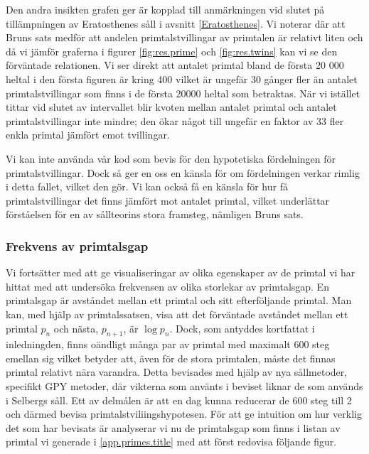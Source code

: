 Den andra insikten grafen ger är kopplad till anmärkningen vid slutet på tillämpningen av Eratosthenes såll i avsnitt \ref{Eratosthenes}.
Vi noterar där att Bruns sats medför att andelen primtalstvillingar av primtalen är relativt liten och då vi jämför graferna i figurer \ref{fig:res.prime} och \ref{fig:res.twins} kan vi se den förväntade relationen.
Vi ser direkt att antalet primtal bland de första 20 000 heltal i den första figuren är kring 400 vilket är ungefär 30 gånger fler än antalet primtalstvillingar som finns i de första 20000 heltal som betraktas.
När vi istället tittar vid slutet av intervallet blir kvoten mellan antalet primtal och antalet primtalstvillingar inte mindre; den ökar något till ungefär en faktor av 33 fler enkla primtal jämfört emot tvillingar.

Vi kan inte använda vår kod som bevis för den hypotetiska fördelningen för primtalstvillingar. 
Dock så ger en oss en känsla för om fördelningen verkar rimlig i detta fallet, vilket den gör. Vi kan också få en känsla för hur få primtalstvillingar det finns jämfört mot antalet primtal, vilket underlättar förståelsen för en av sållteorins stora framsteg, nämligen Bruns sats.


\subsubsection{Frekvens av primtalsgap}

Vi fortsätter med att ge visualiseringar av olika egenskaper av de primtal vi har hittat med att undersöka frekvensen av olika storlekar av primtalsgap. 
En primtalsgap är avståndet mellan ett primtal och sitt efterföljande primtal.
Man kan, med hjälp av primtalssatsen, visa att det förväntade avståndet mellan ett primtal \(p_n\) och nästa, \(p_{n+1}\), är \(\log p_n\).
Dock, som antyddes kortfattat i inledningden, finns oändligt många par av primtal med maximalt 600 steg emellan sig vilket betyder att, även för de stora primtalen, måste det finnas primtal relativt nära varandra.
Detta bevisades med hjälp av nya sållmetoder, specifikt GPY metoder, där vikterna som använts i beviset liknar de som används i Selbergs såll. 
Ett av delmålen är att en dag kunna reducerar de 600 steg till 2 och därmed bevisa primtalstviliingshypotesen.
För att ge intuition om hur verklig det som har bevisats är analyserar vi nu de primtalsgap som finns i listan av primtal vi generade i \ref{app.primes.title} med att först redovisa följande figur.

